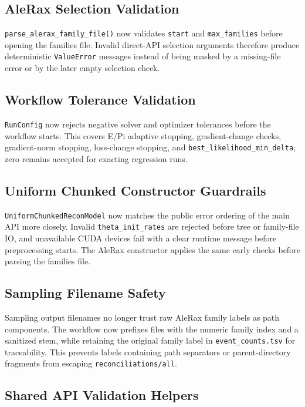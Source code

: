 \documentclass[11pt]{article}
\begin{document}
\subsection{AleRax Selection Validation}

\texttt{parse\_alerax\_family\_file()} now validates \texttt{start} and
\texttt{max\_families} before opening the families file.  Invalid direct-API
selection arguments therefore produce deterministic \texttt{ValueError}
messages instead of being masked by a missing-file error or by the later empty
selection check.

\subsection{Workflow Tolerance Validation}

\texttt{RunConfig} now rejects negative solver and optimizer tolerances before
the workflow starts.  This covers E/Pi adaptive stopping, gradient-change
checks, gradient-norm stopping, loss-change stopping, and
\texttt{best\_likelihood\_min\_delta}; zero remains accepted for exacting
regression runs.

\subsection{Uniform Chunked Constructor Guardrails}

\texttt{UniformChunkedReconModel} now matches the public error ordering of the
main API more closely.  Invalid \texttt{theta\_init\_rates} are rejected before
tree or family-file IO, and unavailable CUDA devices fail with a clear runtime
message before preprocessing starts.  The AleRax constructor applies the same
early checks before parsing the families file.

\subsection{Sampling Filename Safety}

Sampling output filenames no longer trust raw AleRax family labels as path
components.  The workflow now prefixes files with the numeric family index and a
sanitized stem, while retaining the original family label in
\texttt{event\_counts.tsv} for traceability.  This prevents labels containing
path separators or parent-directory fragments from escaping
\texttt{reconciliations/all}.

\subsection{Shared API Validation Helpers}
\end{document}
